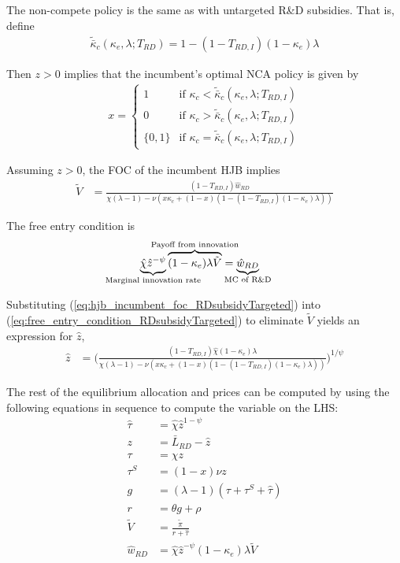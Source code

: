 \documentclass[11pt,english]{article}
\begin{document}
The non-compete policy is the same as with untargeted R\&D subsidies. That is, define
\begin{align}
\tilde{\bar{\kappa}}_c(\kappa_e,\lambda;T_{RD}) = 1 - (1-T_{RD,I})(1-\kappa_e)\lambda
\end{align} 

Then $z > 0$ implies that the incumbent's optimal NCA policy is given by 
\begin{align}
x = \begin{cases}
1 & \textrm{if } \kappa_{c} < \tilde{\bar{\kappa}}_c (\kappa_e, \lambda;T_{RD,I}) \\
0 & \textrm{if } \kappa_{c} > \tilde{\bar{\kappa}}_c (\kappa_e, \lambda;T_{RD,I})\\
\{0,1\} & \textrm{if } \kappa_c = \tilde{\bar{\kappa}}_c (\kappa_e, \lambda;T_{RD,I})
\end{cases} \label{eq:nca_policy_RDsubsidyTargeted}
\end{align}

Assuming $z > 0$, the FOC of the incumbent HJB implies
\begin{align}
\tilde{V} &= \frac{(1-T_{RD,I})\hat{w}_{RD}}{\chi(\lambda -1) - \nu (x\kappa_c + (1-x)(1 - (1-T_{RD,I})(1-\kappa_e)\lambda)) } \label{eq:hjb_incumbent_foc_RDsubsidyTargeted}
\end{align}

The free entry condition is
\begin{align}
\underbrace{\hat{\chi} \hat{z}^{-\psi}}_{\mathclap{\text{Marginal innovation rate}}} \overbrace{(1-\kappa_e) \lambda \tilde{V}}^{\mathclap{\text{Payoff from innovation}}} &= \underbrace{\hat{w}_{RD}}_{\mathclap{\text{MC of R\&D}}} \label{eq:free_entry_condition_RDsubsidyTargeted}
\end{align}

Substituting (\ref{eq:hjb_incumbent_foc_RDsubsidyTargeted}) into (\ref{eq:free_entry_condition_RDsubsidyTargeted}) to eliminate $\tilde{V}$ yields an expression for $\hat{z}$, 
\begin{align}
\hat{z} &= \Bigg( \frac{(1-T_{RD,I})\hat{\chi} (1-\kappa_{e}) \lambda}{\chi(\lambda -1) - \nu (x\kappa_c + (1-x)(1 - (1-T_{RD,I})(1-\kappa_e)\lambda)) } \Bigg)^{1/\psi} \label{eq:effort_entrant_RDsubsidyTargeted}
\end{align}

The rest of the equilibrium allocation and prices can be computed by using the following equations in sequence to compute the variable on the LHS:
\begin{align}
\hat{\tau} &= \hat{\chi} \hat{z}^{1-\psi} \\
z &= \bar{L}_{RD} - \hat{z} \label{eq:labor_resource_constraint_RDsubsidyTargeted}\\ 
\tau &= \chi z \\
\tau^S &= (1-x) \nu z \\
g &= (\lambda - 1) (\tau + \tau^S + \hat{\tau}) \\
r &= \theta g + \rho \\
\tilde{V} &= \frac{\tilde{\pi}}{r + \hat{\tau}} \\ 
\hat{w}_{RD} &= \hat{\chi} \hat{z}^{-\psi} (1-\kappa_e) \lambda \tilde{V} \label{eq:wage_rd_labor_RDsubsidyTargeted}
\end{align}
\end{document}
